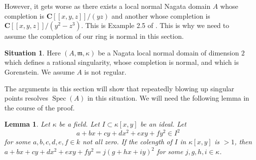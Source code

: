 \documentclass{stacks-project}
\theoremstyle{plain}
\newtheorem{lemma}[subsection]{Lemma}
\theoremstyle{definition}
\newtheorem{situation}[subsection]{Situation}
\theoremstyle{remark}
\numberwithin{equation}{subsection}
\def\Spec{\mathop{\mathrm{Spec}}}
\begin{document}
\medskip\noindent
However, it gets worse as there exists a local normal Nagata domain $A$
whose completion is $\mathbf{C}[[x, y, z]]/(yz)$ and another whose
completion is $\mathbf{C}[[x, y, z]]/(y^2 - z^3)$. This is Example 2.5 of
\cite{Nishimura-few}. This is why we need to assume the completion of
our ring is normal in this section.

\begin{situation}
\label{situation-rational-double-point}
Here $(A, \mathfrak m, \kappa)$ be a Nagata local normal domain of
dimension $2$ which defines a rational singularity, whose completion
is normal, and which is Gorenstein. We assume $A$ is not regular.
\end{situation}

\noindent
The arguments in this section will show that repeatedly blowing
up singular points resolves $\Spec(A)$ in this situation. We will
need the following lemma in the course of the proof.

\begin{lemma}
\label{lemma-issquare}
Let $\kappa$ be a field. Let $I \subset \kappa[x, y]$ be an ideal. Let
$$
a + b x + c y + d x^2 + exy + f y^2 \in I^2
$$
for some $a, b, c, d, e, f \in k$ not all zero. If the colength
of $I$ in $\kappa[x, y]$ is $> 1$, then
$a + b x + c y + d x^2 + exy + f y^2 = j(g + hx + iy)^2$
for some $j, g, h, i \in \kappa$.
\end{lemma}
\end{document}
